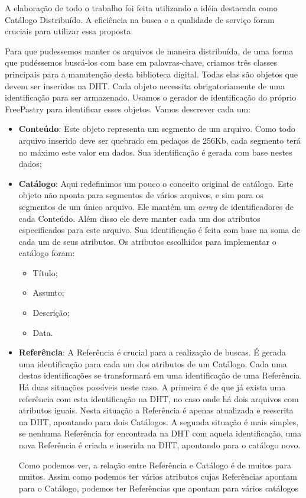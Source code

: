 \documentclass{acm_proc_article-sp}
\begin{document}
A elaboração de todo o trabalho foi feita utilizando a idéia destacada como Catálogo Distribuído. A eficiência na busca e a qualidade de serviço foram cruciais para utilizar essa proposta.

Para que pudessemos manter os arquivos  de maneira distribuída, de uma forma que pudéssemos buscá-los com base em palavras-chave, criamos três classes principais para  a manutenção desta biblioteca digital. Todas elas são objetos que devem ser inseridos na DHT. Cada objeto necessita obrigatoriamente de uma identificação para ser armazenado. Usamos o gerador de identificação do próprio FreePastry para identificar esses objetos. Vamos descrever cada um:
\begin{itemize}
 \item \textbf{Conteúdo}:
	Este objeto representa um segmento de um arquivo. Como todo arquivo inserido deve ser quebrado em pedaços de 256Kb, cada segmento terá no máximo este valor em dados. Sua identificação é gerada com base nestes dados;
	
 \item \textbf{Catálogo}:
	Aqui redefinimos um pouco o conceito original de catálogo. Este objeto não aponta para segmentos de vários arquivos, e sim para os segmentos de um único arquivo. Ele mantém um \textit{array} de identificadores de cada Conteúdo. Além disso ele deve manter cada um dos atributos especificados para este arquivo. Sua identificação é feita com base na soma de cada um de seus atributos.
	Os atributos escolhidos para implementar o catálogo foram:
	\begin{itemize}
	 \item Título;
	 \item Assunto;
	 \item Descrição;
	 \item Data.
	\end{itemize}

	
 \item \textbf{Referência}:
	A Referência é crucial para a realização de buscas. É gerada uma identificação para cada um dos atributos de um Catálogo. Cada uma destas identificações se transformará em uma identificação de uma Referência. Há duas situações possíveis neste caso. A primeira é de que já exista uma referência com esta identificação na DHT, no caso onde há dois arquivos com atributos iguais. Nesta situação a Referência é apenas atualizada e reescrita na DHT, apontando para dois Catálogos. A segunda situação é mais simples, se nenhuma Referência for encontrada na DHT com aquela identificação, uma nova Referência é criada e inserida na DHT, apontando para o catálogo novo.
	
	Como podemos ver, a relação entre Referência e Catálogo é de muitos para muitos. Assim como podemos ter vários atributos cujas Referências apontam para o Catálogo, podemos ter Referências que apontam para vários catálogos
\end{itemize}
\end{document}
